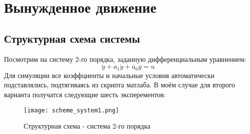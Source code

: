 \chapter{Вынужденное движение}
\label{ch:chap1}
\newcommand\tab[1][1cm]{\hspace*{#1}}



\lstset{style=mystyle}

\section{Структурная схема системы}

Посмотрим на  систему 2-го порядка, заданную дифференциальным уравнением:
$$
\ddot{y} + a_1\dot{y} + a_0y = u
$$
Для симуляции все коэффциенты и начальные условия автоматически подставлялись, подтягиваясь из скрипта матлаба. 
В моём случае для второго варианта получатся следующие шесть эксперементов:
\begin{figure}[ht]
    \centering
    \texttt{[image: scheme\_system1.png]}
	\caption{Структурная схема - система 2-го порядка}
\end{figure}
\newpage
